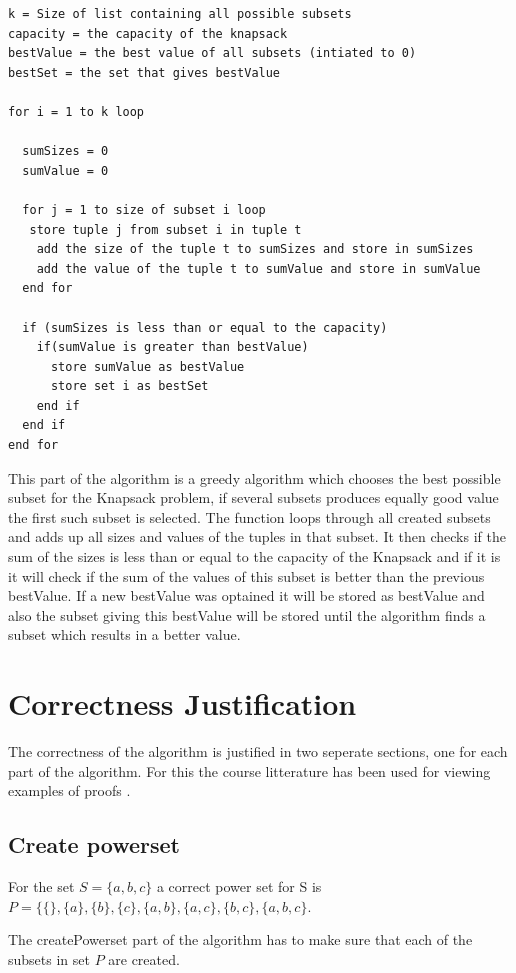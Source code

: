 \documentclass{inc/mas}
\begin{document}
\begin{lstlisting}
k = Size of list containing all possible subsets
capacity = the capacity of the knapsack
bestValue = the best value of all subsets (intiated to 0)
bestSet = the set that gives bestValue

for i = 1 to k loop

  sumSizes = 0
  sumValue = 0

  for j = 1 to size of subset i loop
   store tuple j from subset i in tuple t
    add the size of the tuple t to sumSizes and store in sumSizes
    add the value of the tuple t to sumValue and store in sumValue
  end for

  if (sumSizes is less than or equal to the capacity)
    if(sumValue is greater than bestValue)
      store sumValue as bestValue
      store set i as bestSet
    end if
  end if
end for
\end{lstlisting}

\noindent This part of the algorithm is a greedy algorithm which chooses the best possible subset for the Knapsack problem, if several subsets produces equally good value the first such subset is selected. The function loops through all created subsets and adds up all sizes and values of the tuples in that subset. It then checks if the sum of the sizes is less than or equal to the capacity of the Knapsack and if it is it will check if the sum of the values of this subset is better than the previous bestValue. If a new bestValue was optained it will be stored as bestValue and also the subset giving this bestValue will be stored until the algorithm finds a subset which results in a better value.\\

\section{Correctness Justification}

The correctness of the algorithm is justified in two seperate sections, one for each part of the algorithm. For this the course litterature has been used for viewing examples of proofs \citep{Tardos}.

\subsection{Create powerset}
For the set $S = \{a,b,c\}$ a correct power set for S is $P = \{\{\},\{a\},\{b\},\{c\},\{a,b\},\{a,c\},\{b,c\},\{a,b,c\}$.

The createPowerset part of the algorithm has to make sure that each of the subsets in set $P$ are created. 
\end{document}
